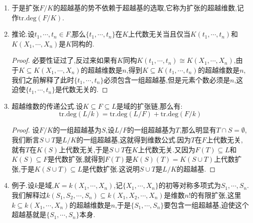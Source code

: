 \begin{enumerate}
\begin{proof}
    	先设$S$是有限集,记作$S=\{s_1,\cdots,s_n\}$.按照定义$F$不会是$K(S-\{s_1\})$上的代数扩张,于是必然存在某个$t\in T$使得$t$在$K(S-\{s_1\})$上超越(否则的话$T$中的元都在$K(S-\{s_1\})$上代数,结合$K(T)\subseteq F$是代数扩张,得到$F$在$K(S-\{s_1\})$上代数,矛盾),于是$\{s_2,\cdots,s_n,t\}$是$K$上的代数无关集.另外$s_1$必须在$K(s_2,\cdots,s_n,t)$上代数,因为否则的话$\{s_1,\cdots,s_n,t\}$也是代数无关集,这和$S$的极大性矛盾.记$t_1=t$,于是我们证明了$\{s_2,\cdots,s_n,t_1\}$也是一组超越基.归纳操作下去得到$T$中的$n$个元$t_1,\cdots,t_n$构成扩张的超越基,这迫使$|T|=n$.
    	
    	\qquad
    	
    	下面设$S$和$T$都是无限集合.任取$t\in T$,那么它在$K(S)$上代数,否则$S\cup\{t\}$也是代数无关集和$S$的极大性矛盾.于是存在一个有限集合$S_t\subseteq S$使得$t$在$K(S_t)$上代数.记$S'=\cup_{t\in T}S_t\subseteq S$,那么$T$在$K(S')$上代数.又因为$F$在$K(T)$上代数,得到$F$在$K(S')$上代数.于是$S'$得包含扩张的一组超越基,这迫使$S=S'$.于是有$|S|=|S'|=|\cup_{t\in T}S_t|\le|T\times\mathbb{N}|=|T|$.同理得到$|T|\le|S|$,于是$|S|=|T|$.
    \end{proof}
    \item 于是扩张$F/K$的超越基的势不依赖于超越基的选取,它称为扩张的超越维数,记作$\mathrm{tr.deg}(F/K)$.
    \item 推论.设$t_1,\cdots,t_n\in F$,那么$\{t_1,\cdots,t_n\}$在$K$上代数无关当且仅当$K(t_1,\cdots,t_n)$和$K(X_1,\cdots,X_n)$是$K$同构的.
    \begin{proof}
    	
    	必要性证过了,反过来如果有$K$同构$K(t_1,\cdots,t_n)\cong K(X_1,\cdots,X_n)$,由于$K\subseteq K(X_1,\cdots,X_n)$的超越维数是$n$,得到$K\subseteq K(t_1,\cdots,t_n)$的超越维数是$n$,我们之前解释了此时$\{t_1,\cdots,t_n\}$必须包含一组超越基,但是元素个数必须是$n$,这迫使$\{t_1,\cdots,t_n\}$是代数无关的.
    \end{proof}
    \item 超越维数的传递公式.设$K\subseteq F\subseteq L$是域的扩张链,那么有:
    $$\mathrm{tr.deg}(L/k)=\mathrm{tr.deg}(L/F)+\mathrm{tr.deg}(F/k)$$
    \begin{proof}
    	
    	设$F/K$的一组超越基为$S$,设$L/F$的一组超越基为$T$,那么明显有$T\cap S=\emptyset$,我们断言$S\cup T$是$L/K$的一组超越基,这就得到维数公式.因为$T$在$F$上代数无关,就有$T$在$K(S)$上代数无关,于是$S\cup T$在$K$上代数无关.又因为$F(T)\subseteq L$和$K(S)\subseteq F$是代数扩张,就得到$F(T)$是$K(S)(T)=K(S\cup T)$上代数扩张,于是$K(S\cup T)\subseteq L$是代数扩张.这说明$S\cup T$是$L/K$的超越基.
    \end{proof}
    \item 例子.设$k$是域,$K=k(X_1,\cdots,X_n)$,记$\{X_1,\cdots,X_n\}$的初等对称多项式为$S_1,\cdots,S_n$.我们解释过$k(S_1,S_2,\cdots,S_n)\subseteq k(X_1,X_2,\cdots,X_n)$是维数$n!$的有限扩张,这里$k\subseteq k(X_1,\cdots,X_n)$的超越维数是$n$,于是$\{S_1,\cdots,S_n\}$要包含一组超越基,迫使这个超越基就是$\{S_1,\cdots,S_n\}$本身.
\end{enumerate}


